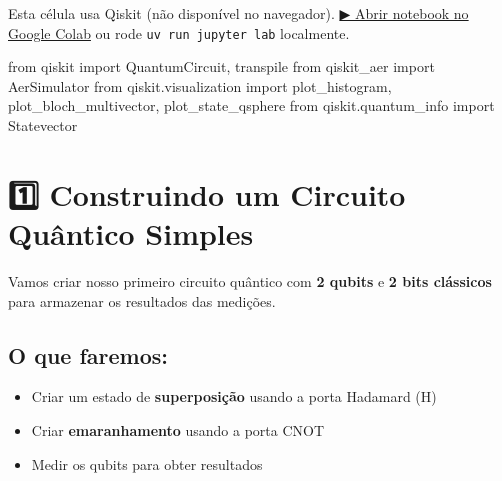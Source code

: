 \documentclass[
  brazilian,
]{report}
\newenvironment{Shaded}{\begin{snugshade}}{\end{snugshade}}
\newcommand{\ImportTok}[1]{\textcolor[rgb]{0.00,0.46,0.62}{#1}}
\newcommand{\NormalTok}[1]{\textcolor[rgb]{0.00,0.23,0.31}{#1}}
\providecommand{\tightlist}{%
  \setlength{\itemsep}{0pt}\setlength{\parskip}{0pt}}
\begin{document}
\begin{tcolorbox}[enhanced jigsaw, arc=.35mm, bottomrule=.15mm, bottomtitle=1mm, breakable, colback=white, colbacktitle=quarto-callout-warning-color!10!white, colframe=quarto-callout-warning-color-frame, coltitle=black, left=2mm, leftrule=.75mm, opacityback=0, opacitybacktitle=0.6, rightrule=.15mm, title=\textcolor{quarto-callout-warning-color}{\faExclamationTriangle}\hspace{0.5em}{⚛️ Célula Qiskit --- execute no Colab ou localmente}, titlerule=0mm, toprule=.15mm, toptitle=1mm]

Esta célula usa Qiskit (não disponível no navegador).
\href{https://colab.research.google.com/github/maxwellamaral/aula-quantum/blob/main/notebooks/01-intro.ipynb}{▶
Abrir notebook no Google Colab} ou rode \texttt{uv\ run\ jupyter\ lab}
localmente.

\begin{Shaded}
\begin{Highlighting}[]

\ImportTok{from}\NormalTok{ qiskit }\ImportTok{import}\NormalTok{ QuantumCircuit, transpile}
\ImportTok{from}\NormalTok{ qiskit\_aer }\ImportTok{import}\NormalTok{ AerSimulator}
\ImportTok{from}\NormalTok{ qiskit.visualization }\ImportTok{import}\NormalTok{ plot\_histogram, plot\_bloch\_multivector, plot\_state\_qsphere}
\ImportTok{from}\NormalTok{ qiskit.quantum\_info }\ImportTok{import}\NormalTok{ Statevector}
\end{Highlighting}
\end{Shaded}

\end{tcolorbox}

\section{1️⃣ Construindo um Circuito Quântico
Simples}\label{construindo-um-circuito-quuxe2ntico-simples}

Vamos criar nosso primeiro circuito quântico com \textbf{2 qubits} e
\textbf{2 bits clássicos} para armazenar os resultados das medições.

\subsection{O que faremos:}\label{o-que-faremos}

\begin{itemize}
\tightlist
\item
  Criar um estado de \textbf{superposição} usando a porta Hadamard (H)
\item
  Criar \textbf{emaranhamento} usando a porta CNOT
\item
  Medir os qubits para obter resultados
\end{itemize}
\end{document}
